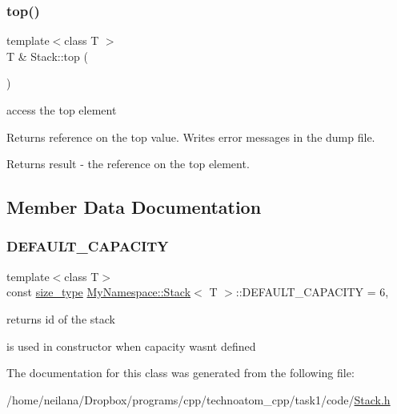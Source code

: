 \subsubsection{\texorpdfstring{top()}{top()}}
{\footnotesize\ttfamily template$<$class T $>$ \\
T \& Stack\+::top (\begin{DoxyParamCaption}{ }\end{DoxyParamCaption})}



access the top element 

Returns reference on the top value. Writes error messages in the dump file.

\begin{DoxyReturn}{Returns}
{\ttfamily result} -\/ the reference on the top element. 
\end{DoxyReturn}


\subsection{Member Data Documentation}
\mbox{\label{class_my_namespace_1_1_stack_a4b75778037e106878d008d6a859dad27}} 
\subsubsection{\texorpdfstring{D\+E\+F\+A\+U\+L\+T\+\_\+\+C\+A\+P\+A\+C\+I\+TY}{DEFAULT\_CAPACITY}}
{\footnotesize\ttfamily template$<$class T$>$ \\
const \hyperlink{class_my_namespace_1_1_stack_a19c43f92e11d91ed645058833af88a86}{size\+\_\+type} \hyperlink{class_my_namespace_1_1_stack}{My\+Namespace\+::\+Stack}$<$ T $>$\+::D\+E\+F\+A\+U\+L\+T\+\_\+\+C\+A\+P\+A\+C\+I\+TY = 6\hspace{0.3cm}{\ttfamily [static]}, {\ttfamily [private]}}



returns id of the stack 

is used in constructor when capacity wasn\textquotesingle{}t defined 

The documentation for this class was generated from the following file\+:\begin{DoxyCompactItemize}
\item 
/home/neilana/\+Dropbox/programs/cpp/technoatom\+\_\+cpp/task1/code/\hyperlink{_stack_8h}{Stack.\+h}\end{DoxyCompactItemize}
